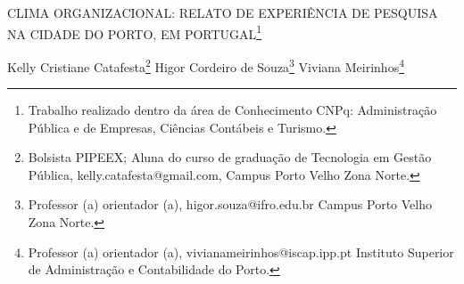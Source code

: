 \documentclass[article,12pt,onesidea,4paper,english,brazil]{abntex2}
\begin{document}
	
	
	\frenchspacing 
	
	\begin{center}
		\LARGE CLIMA ORGANIZACIONAL: RELATO DE EXPERIÊNCIA DE PESQUISA NA CIDADE DO PORTO, EM PORTUGAL\footnote{Trabalho realizado dentro da área de Conhecimento CNPq: Administração Pública e de Empresas, Ciências Contábeis e Turismo.}
		
		\normalsize
	Kelly Cristiane Catafesta\footnote{Bolsista PIPEEX; Aluna do curso de graduação de Tecnologia em Gestão Pública, kelly.catafesta@gmail.com, Campus Porto Velho Zona Norte.} 
	Higor Cordeiro de Souza\footnote{Professor (a) orientador (a), higor.souza@ifro.edu.br Campus Porto Velho Zona Norte.} 
	Viviana Meirinhos\footnote{Professor (a) orientador (a), vivianameirinhos@iscap.ipp.pt Instituto Superior de Administração e Contabilidade do Porto.} 
	\end{center}
	
\end{document}
